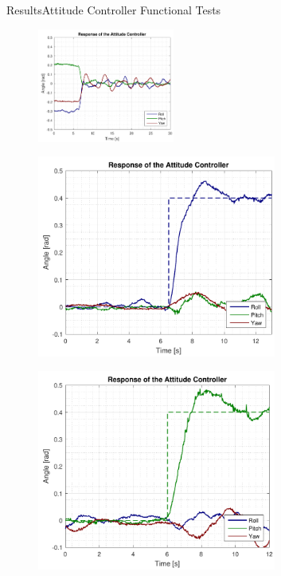 \begin{frame}{Results}{Attitude Controller Functional Tests}
    \begin{figure}[H]
        \centering
        \includegraphics[width=0.4\textwidth]{figures/attitudeEqTest}  
      \end{figure} 
      
      \begin{minipage}{\linewidth}
          \begin{minipage}{0.49\linewidth}
              \begin{figure}[H]
                  \centering
                  \includegraphics[width=0.7\textwidth]{figures/rollStepTest}  
              \end{figure}   
          \end{minipage}
          \hspace{0.03\linewidth}
          \begin{minipage}{0.49\linewidth}
              \begin{figure}[H]
                  \centering
                  \includegraphics[width=0.7\textwidth]{figures/pitchStepTest}  

\end{figure}
\end{minipage}
\end{minipage}
\end{frame}
